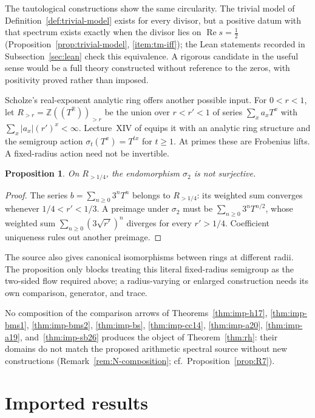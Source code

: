\documentclass[11pt]{amsart}
\theoremstyle{plain}
\newtheorem{proposition}[theorem]{Proposition}
\theoremstyle{definition}
\theoremstyle{remark}
\numberwithin{equation}{section}
\newcommand{\R}{\mathbb{R}}
\newcommand{\Z}{\mathbb{Z}}
\DeclareMathOperator{\Rea}{Re}
\renewcommand{\Re}{\Rea}
\begin{document}
The tautological constructions show the same circularity. The trivial
model of Definition~\ref{def:trivial-model} exists for every divisor,
but a positive datum with that spectrum exists exactly when the divisor
lies on $\Re s=\tfrac12$ (Proposition~\ref{prop:trivial-model},
\ref{item:tm-iff}); the Lean statements recorded in
Subsection~\ref{sec:lean} check this equivalence. A rigorous candidate
in the useful sense would be a full theory constructed without
reference to the zeros, with positivity proved rather than imposed.

Scholze's real-exponent analytic ring offers another possible input.
For $0<r<1$, let $R_{>r}=\Z((T^\R))_{>r}$ be the union over
$r<r'<1$
of series $\sum_xa_xT^x$ with $\sum_x|a_x|(r')^x<\infty$.
Lecture~XIV of \cite[Theorem~14.11]{Scholze2026AnalyticGeometry}
equips it with an analytic ring structure and the semigroup action
$\sigma_t(T^x)=T^{tx}$ for $t\ge1$. At primes these are Frobenius
lifts. A fixed-radius action need not be invertible.

\begin{proposition}\label{prop:scholze-fixed-radius}
On $R_{>1/4}$, the endomorphism $\sigma_2$ is not surjective.
\end{proposition}

\begin{proof}
The series $b=\sum_{n\ge0}3^nT^n$ belongs to $R_{>1/4}$: its
weighted sum converges whenever $1/4<r'<1/3$. A preimage under
$\sigma_2$ must be $\sum_{n\ge0}3^nT^{n/2}$, whose weighted sum
$\sum_{n\ge0}(3\sqrt{r'})^n$ diverges for every $r'>1/4$.
Coefficient uniqueness rules out another preimage.
\end{proof}

The source also gives canonical isomorphisms between rings at
different radii. The proposition only blocks treating this literal
fixed-radius semigroup as the two-sided flow required above; a
radius-varying or enlarged construction needs its own comparison,
generator, and trace.

No composition of the comparison arrows of
Theorems~\ref{thm:imp-h17}, \ref{thm:imp-bms1}, \ref{thm:imp-bms2},
\ref{thm:imp-bs}, \ref{thm:imp-cc14}, \ref{thm:imp-a20},
\ref{thm:imp-a19}, and~\ref{thm:imp-sb26} produces the object of
Theorem~\ref{thm:rh}: their domains do not match the proposed
arithmetic spectral source without new constructions
(Remark~\ref{rem:N-composition}; cf.\ Proposition~\ref{prop:R7}).

\section{Imported results}\label{sec:imported}
\end{document}
